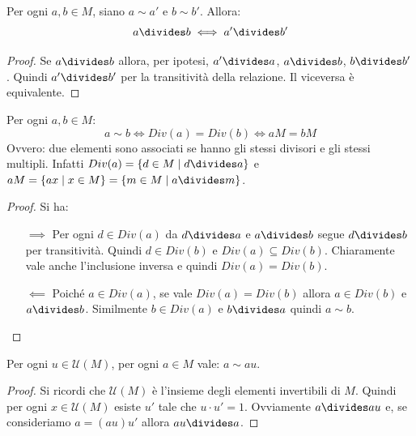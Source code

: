 \begin{propbox}
	Per ogni $a,b \in M$, siano $a \sim a'$ e $b \sim b'$. Allora:
	\begin{displaymath}
		a \divides b \iff a' \divides b'
	\end{displaymath}
\end{propbox}

\begin{proof}
	Se $a \divides b$ allora, per ipotesi, $a' \divides a$, $a \divides b$, $b \divides b'$. Quindi $a' \divides b'$ per la transitività della relazione. Il viceversa è equivalente.
\end{proof}


\begin{propbox}
	Per ogni $a,b \in M$:
	\begin{displaymath}
		a \sim b \iff Div(a)= Div(b) \iff aM = bM
	\end{displaymath}
	Ovvero: due elementi sono associati se hanno gli stessi divisori e gli stessi multipli. Infatti $Div(a) = \{ d \in M \; | \; d \divides a \}$ e $aM = \{ax \; | \; x \in M\} = \{m \in M \; | \; a \divides m \}$.
\end{propbox}

\begin{proof} Si ha:
	\begin{itemize}
		\item[$\implies$] 	Per ogni $d \in Div(a)$ da $d \divides a$ e $a \divides b$ segue $d \divides b$ per transitività. Quindi $d \in Div(b)$ e $Div(a) \subseteq Div(b)$. Chiaramente vale anche l'inclusione inversa e quindi $Div(a)= Div(b)$.
		\item[$\impliedby$] Poiché $a \in Div(a)$, se vale $Div(a)=Div(b)$ allora $a \in Div(b)$ e $a \divides b$. Similmente $b \in Div(a)$ e $b \divides a$ quindi $a \sim b$.
	\end{itemize}
\end{proof}


\begin{propbox}
	Per ogni $u \in \mathcal{U}(M)$, per ogni $a \in M$ vale: $a \sim au$.
\end{propbox}

\begin{proof}
	Si ricordi che $\mathcal{U}(M)$ è l'insieme degli elementi invertibili di $M$. Quindi per ogni $x \in \mathcal{U}(M)$ esiste $u'$ tale che $u\cdot u'=1$. Ovviamente $a \divides au$ e, se consideriamo $a = (au) u'$ allora $au \divides a$.
\end{proof}


